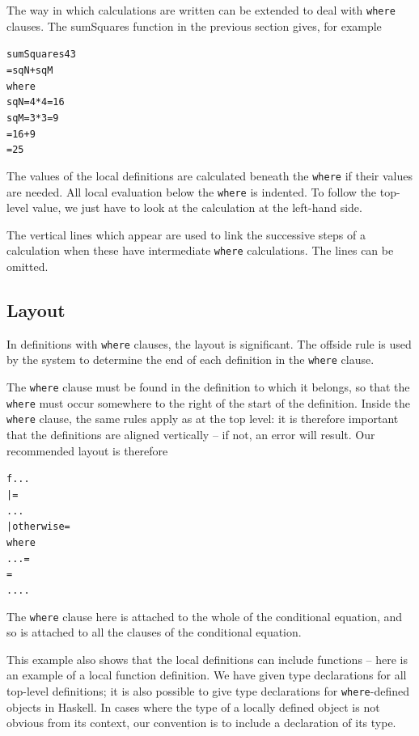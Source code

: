 The way in which calculations are written
can be extended to deal with \texttt{where} clauses. The {\ttfamily
sumSquares} function in the previous section gives, for example
\begin{alltt}
sumSquares 4 3
= sqN + sqM
  where
  sqN = 4*4 = 16
\vertline{30pt}  sqM = 3*3 = 9
= 16 + 9
= 25
\end{alltt}
The values of the local definitions are calculated beneath the \texttt{where} if
their values are needed. All local evaluation below the \texttt{where} is indented. To
follow the top-level value, we just have to look at the calculation at the
left-hand side.

The vertical lines which appear are used to link the successive steps of
a
calculation when these have intermediate \texttt{where} calculations. The lines
can be omitted.



\subsection*{Layout}

In definitions with \texttt{where} clauses, the layout is significant. The 
offside rule is
used by the 
system to determine the end of each definition in the \texttt{where} clause. 

The \texttt{where} clause
must be found in the definition to which it belongs, so that the \texttt{where}
must occur somewhere to the right of the start of the definition. Inside the
\texttt{where} clause, the same rules apply as at the top level: it is therefore
important that the definitions are aligned vertically -- if not, an error will
result.
Our recommended layout is therefore
\begin{alltt}
f \pone \ptwo ... \pk
  | \gone          = \eone  
   ...
  | otherwise   = \er  
    where
    \vone  \aone ...  = \rone
    \vtwo = \rtwo
    ....
\end{alltt}
The \texttt{where} clause here is attached to the whole of the
conditional equation, and so is attached to all the clauses of the
conditional equation.

This example also shows that the local definitions can include functions
-- here \texttt{\vone} is an example of a local function definition. We have
given type declarations for all top-level definitions; it is
also possible to give type declarations for \texttt{where}-defined objects in
Haskell. In cases where the type of a locally defined object
is not obvious from its context, our convention is to
include a declaration of its type.
\vspace{5pt}


